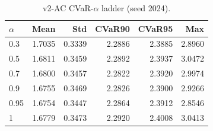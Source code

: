\begin{table}[H]
    \centering
    \caption{v2-AC CVaR-$\alpha$ ladder (seed 2024).}
    \label{tab:v2_ac_alpha}
    \begin{tabular}{@{}lrrrrr@{}}
        \toprule
        $\alpha$ & Mean & Std & CVaR90 & CVaR95 & Max \\
        \midrule
        0.3 & 1.7035 & 0.3339 & 2.2886 & 2.3885 & 2.8960 \\
        0.5 & 1.6811 & 0.3459 & 2.2892 & 2.3937 & 3.0472 \\
        0.7 & 1.6800 & 0.3457 & 2.2822 & 2.3920 & 2.9974 \\
        0.9 & 1.6755 & 0.3469 & 2.2826 & 2.3900 & 2.9266 \\
        0.95 & 1.6754 & 0.3447 & 2.2864 & 2.3912 & 2.8546 \\
        1 & 1.6779 & 0.3473 & 2.2920 & 2.4008 & 3.0413 \\
        \bottomrule
    \end{tabular}
\end{table}
